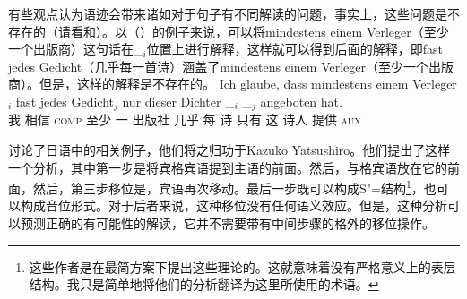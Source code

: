 \noindent
有些观点认为语迹会带来诸如对于句子有不同解读的问题，事实上，这些问题是不存在的（请看\citealp[]{Kiss2001a}和\citealp[\S~2.6]{Fanselow2001a}）。以（）的例子来说，可以将mindestens einem Verleger（至少一个出版商）这句话在\_$_i$位置上进行解释，这样就可以得到后面的解释，即fast jedes Gedicht（几乎每一首诗）涵盖了mindestens einem Verleger（至少一个出版商）。但是，这样的解释是不存在的。
\ea
\gll Ich glaube, dass mindestens einem Verleger$_i$ fast jedes Gedicht$_j$ nur dieser Dichter \_$_i$ \_$_j$ angeboten hat.\\
	 我 相信 \textsc{comp} 至少 一 出版社 几乎 每 诗 只有 这 诗人 {} {} 提供 \textsc{aux}\\
\z

 \citet[]{SE2002a}讨论了日语中的相关例子，他们将之归功于Kazuko 
Yatsushiro。他们提出了这样一个分析，其中第一步是将宾格宾语提到主语的前面。然后，与格宾语放在它的前面，然后，第三步移位是，宾语再次移动。最后一步既可以构成S"=结构\footnote{%
   这些作者是在最简方案下提出这些理论的。这就意味着没有严格意义上的表层结构。我只是简单地将他们的分析翻译为这里所使用的术语。
}，也可以构成音位形式。对于后者来说，这种移位没有任何语义效应。但是，这种分析可以预测正确的有可能性的解读，它并不需要带有中间步骤的格外的移位操作。

